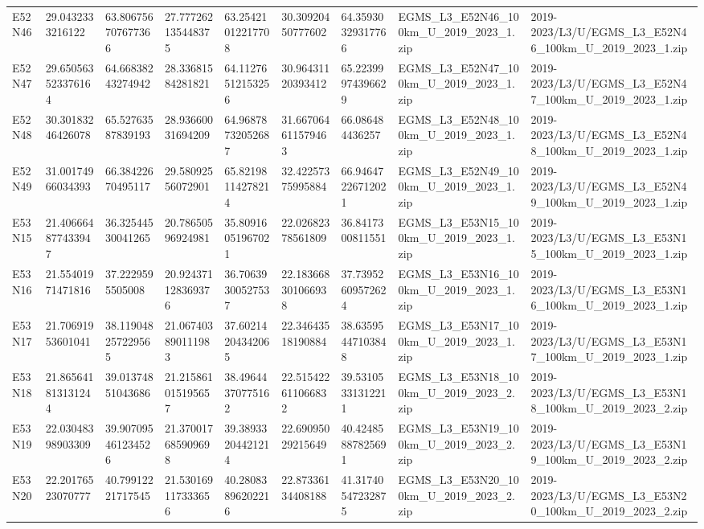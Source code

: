 \begin{landscape}
\begin{longtable}{lllllllll}
E52N46 & 29.0432333216122 & 63.806756707677366 & 27.777262135448375 & 63.25421012217708 & 30.30920450777602 & 64.35930329317766 & EGMS\_L3\_E52N46\_100km\_U\_2019\_2023\_1.zip & 2019-2023/L3/U/EGMS\_L3\_E52N46\_100km\_U\_2019\_2023\_1.zip \\
E52N47 & 29.650563523376164 & 64.66838243274942 & 28.33681584281821 & 64.11276512153256 & 30.96431120393412 & 65.22399974396629 & EGMS\_L3\_E52N47\_100km\_U\_2019\_2023\_1.zip & 2019-2023/L3/U/EGMS\_L3\_E52N47\_100km\_U\_2019\_2023\_1.zip \\
E52N48 & 30.30183246426078 & 65.52763587839193 & 28.93660031694209 & 64.96878732052687 & 31.667064611579463 & 66.086484436257 & EGMS\_L3\_E52N48\_100km\_U\_2019\_2023\_1.zip & 2019-2023/L3/U/EGMS\_L3\_E52N48\_100km\_U\_2019\_2023\_1.zip \\
E52N49 & 31.00174966034393 & 66.38422670495117 & 29.58092556072901 & 65.82198114278214 & 32.42257375995884 & 66.94647226712021 & EGMS\_L3\_E52N49\_100km\_U\_2019\_2023\_1.zip & 2019-2023/L3/U/EGMS\_L3\_E52N49\_100km\_U\_2019\_2023\_1.zip \\
E53N15 & 21.406664877433947 & 36.32544530041265 & 20.78650596924981 & 35.80916051967021 & 22.02682378561809 & 36.8417300811551 & EGMS\_L3\_E53N15\_100km\_U\_2019\_2023\_1.zip & 2019-2023/L3/U/EGMS\_L3\_E53N15\_100km\_U\_2019\_2023\_1.zip \\
E53N16 & 21.55401971471816 & 37.2229595505008 & 20.924371128369376 & 36.70639300527537 & 22.183668301066938 & 37.73952609572624 & EGMS\_L3\_E53N16\_100km\_U\_2019\_2023\_1.zip & 2019-2023/L3/U/EGMS\_L3\_E53N16\_100km\_U\_2019\_2023\_1.zip \\
E53N17 & 21.70691953601041 & 38.119048257229565 & 21.067403890111983 & 37.60214204342065 & 22.34643518190884 & 38.63595447103848 & EGMS\_L3\_E53N17\_100km\_U\_2019\_2023\_1.zip & 2019-2023/L3/U/EGMS\_L3\_E53N17\_100km\_U\_2019\_2023\_1.zip \\
E53N18 & 21.865641813131244 & 39.01374851043686 & 21.215861015195657 & 38.49644370775162 & 22.515422611066832 & 39.53105331312211 & EGMS\_L3\_E53N18\_100km\_U\_2019\_2023\_2.zip & 2019-2023/L3/U/EGMS\_L3\_E53N18\_100km\_U\_2019\_2023\_2.zip \\
E53N19 & 22.03048398903309 & 39.907095461234526 & 21.370017685909698 & 39.38933204421214 & 22.69095029215649 & 40.42485887825691 & EGMS\_L3\_E53N19\_100km\_U\_2019\_2023\_2.zip & 2019-2023/L3/U/EGMS\_L3\_E53N19\_100km\_U\_2019\_2023\_2.zip \\
E53N20 & 22.20176523070777 & 40.79912221717545 & 21.530169117333656 & 40.28083896202216 & 22.87336134408188 & 41.31740547232875 & EGMS\_L3\_E53N20\_100km\_U\_2019\_2023\_2.zip & 2019-2023/L3/U/EGMS\_L3\_E53N20\_100km\_U\_2019\_2023\_2.zip \\

\end{longtable}
\end{landscape}
